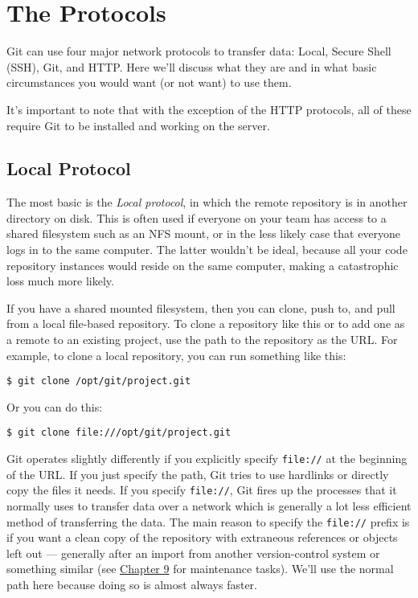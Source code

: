 \documentclass[a4paper]{book}
\newcommand{\prechap}{Chapter }
\newcommand{\postchap}{}
\newcommand{\chapref}[1]{\hyperref[chap:#1]{\prechap #1\postchap}}
\begin{document}
\section{The Protocols}

Git can use four major network protocols to transfer data: Local, Secure Shell (SSH), Git, and HTTP. Here we'll discuss what they are and in what basic circumstances you would want (or not want) to use them.

It's important to note that with the exception of the HTTP protocols, all of these require Git to be installed and working on the server.

\subsection{Local Protocol}

The most basic is the \emph{Local protocol}, in which the remote repository is in another directory on disk. This is often used if everyone on your team has access to a shared filesystem such as an NFS mount, or in the less likely case that everyone logs in to the same computer. The latter wouldn't be ideal, because all your code repository instances would reside on the same computer, making a catastrophic loss much more likely.

If you have a shared mounted filesystem, then you can clone, push to, and pull from a local file-based repository. To clone a repository like this or to add one as a remote to an existing project, use the path to the repository as the URL. For example, to clone a local repository, you can run something like this:

\begin{shaded}\begin{verbatim}
$ git clone /opt/git/project.git
\end{verbatim}\end{shaded}

Or you can do this:

\begin{shaded}\begin{verbatim}
$ git clone file:///opt/git/project.git
\end{verbatim}\end{shaded}

Git operates slightly differently if you explicitly specify \texttt{file://} at the beginning of the URL. If you just specify the path, Git tries to use hardlinks or directly copy the files it needs. If you specify \texttt{file://}, Git fires up the processes that it normally uses to transfer data over a network which is generally a lot less efficient method of transferring the data. The main reason to specify the \texttt{file://} prefix is if you want a clean copy of the repository with extraneous references or objects left out --- generally after an import from another version-control system or something similar (see \chapref{9} for maintenance tasks). We'll use the normal path here because doing so is almost always faster.
\end{document}
